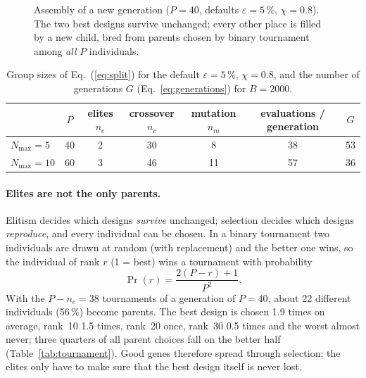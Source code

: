 \begin{figure}[htbp]
{%
}
\caption{Assembly of a new generation ($P=40$, defaults $\varepsilon=5\,\%$, $\chi=0.8$). The two
best designs survive unchanged; every other place is filled by a new child, bred from parents
chosen by binary tournament among \emph{all} $P$ individuals.}
\label{fig:split}
\end{figure}

\begin{table}[htbp]
\centering
\caption{Group sizes of Eq.~(\ref{eq:split}) for the default $\varepsilon=5\,\%$, $\chi=0.8$, and the
number of generations $G$ (Eq.~\ref{eq:generations}) for $B=2000$.}
\label{tab:split}
\begin{tabular}{@{}lcccccc@{}}
\toprule
 & $P$ & elites $n_e$ & crossover $n_c$ & mutation $n_m$ & evaluations / generation & $G$ \\
\midrule
$N_{\max}=5$  & 40 & 2 & 30 & 8  & 38 & 53 \\
$N_{\max}=10$ & 60 & 3 & 46 & 11 & 57 & 36 \\
\bottomrule
\end{tabular}
\end{table}

\paragraph{Elites are not the only parents.} Elitism decides which designs \emph{survive}
unchanged; selection decides which designs \emph{reproduce}, and every individual can be chosen.
In a binary tournament two individuals are drawn at random (with replacement) and the better one
wins, so the individual of rank $r$ (1 = best) wins a tournament with probability
\begin{equation}
\Pr(r)=\frac{2(P-r)+1}{P^2}.
\label{eq:tournament}
\end{equation}
With the $P-n_e=38$ tournaments of a generation of $P=40$, about 22 different individuals (56\,\%)
become parents. The best design is chosen 1.9 times on average, rank~10 1.5 times, rank~20 once,
rank~30 0.5 times and the worst almost never; three quarters of all parent choices fall on the
better half (Table~\ref{tab:tournament}). Good genes therefore spread through selection; the
elites only have to make sure that the best design itself is never lost.

